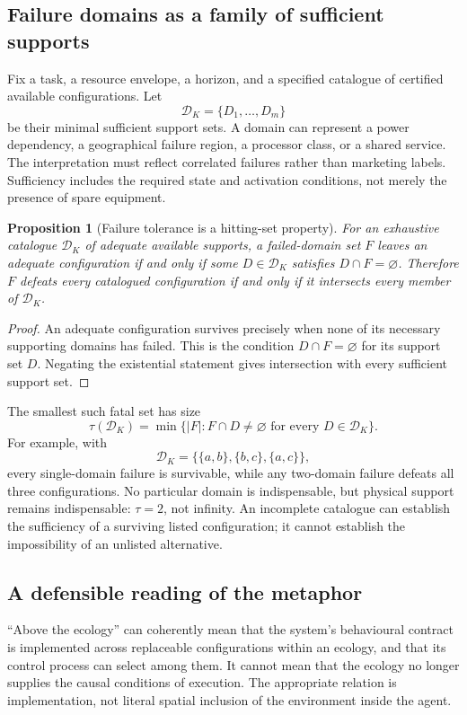 \documentclass[11pt,a4paper]{article}
\newtheorem{proposition}[theorem]{Proposition}
\theoremstyle{definition}
\theoremstyle{remark}
\newcommand{\calK}{K}
\begin{document}
\subsection{Failure domains as a family of sufficient supports}
Fix a task, a resource envelope, a horizon, and a specified catalogue of certified available configurations. Let
\[
 \mathscr D_{\calK}=\{D_1,\ldots,D_m\}
\]
be their minimal sufficient support sets. A domain can represent a power dependency, a geographical failure region, a processor class, or a shared service. The interpretation must reflect correlated failures rather than marketing labels. Sufficiency includes the required state and activation conditions, not merely the presence of spare equipment.

\begin{proposition}[Failure tolerance is a hitting-set property]\label{prop:hitting}
For an exhaustive catalogue $\mathscr D_{\calK}$ of adequate available supports, a failed-domain set $F$ leaves an adequate configuration if and only if some $D\in\mathscr D_{\calK}$ satisfies $D\cap F=\varnothing$. Therefore $F$ defeats every catalogued configuration if and only if it intersects every member of $\mathscr D_{\calK}$.
\end{proposition}
\begin{proof}
An adequate configuration survives precisely when none of its necessary supporting domains has failed. This is the condition $D\cap F=\varnothing$ for its support set $D$. Negating the existential statement gives intersection with every sufficient support set.
\end{proof}
The smallest such fatal set has size
\[
 \tau(\mathscr D_{\calK})
 =\min\{|F|:F\cap D\neq\varnothing\text{ for every }D\in\mathscr D_{\calK}\}.
\]
For example, with
\begin{equation}\label{eq:triangle}
 \mathscr D_{\calK}=\{\{a,b\},\{b,c\},\{a,c\}\},
\end{equation}
every single-domain failure is survivable, while any two-domain failure defeats all three configurations. No particular domain is indispensable, but physical support remains indispensable: $\tau=2$, not infinity. An incomplete catalogue can establish the sufficiency of a surviving listed configuration; it cannot establish the impossibility of an unlisted alternative.

\subsection{A defensible reading of the metaphor}
``Above the ecology'' can coherently mean that the system's behavioural contract is implemented across replaceable configurations within an ecology, and that its control process can select among them. It cannot mean that the ecology no longer supplies the causal conditions of execution. The appropriate relation is implementation, not literal spatial inclusion of the environment inside the agent.
\end{document}
